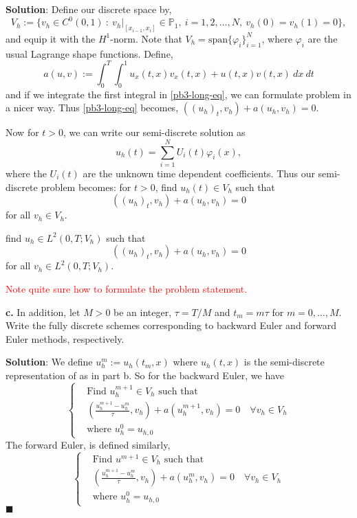\documentclass[11pt]{article}
\begin{document}
\vskip 1cm

{\bf Solution}: Define our discrete space by,
\begin{equation*}
    V_h := \{ v_h \in C^0(0,1) \: : \: v_h|_{[x_{i-1}, x_i]} \in \mathbb{P}_1, \: i = 1, 2, \ldots, N, \: v_h(0) = v_h(1) = 0 \},
\end{equation*}
and equip it with the $H^1$-norm.
Note that $V_h = \text{span}\{\varphi_i\}_{i=1}^N$, where $\varphi_i$ are the usual Lagrange shape functions.
Define,
\begin{equation*}
    a(u,v) := \int_0^T \int_0^1 u_x(t,x) v_x(t,x) + u(t,x) v(t,x) \: dx \: dt
\end{equation*}
and if we integrate the first integral in \eqref{pb3-long-eq}, we can formulate problem in a nicer way.
Thus \eqref{pb3-long-eq} becomes, $((u_h)_t, v_h) + a(u_h, v_h) = 0$.

Now for $t > 0$, we can write our semi-discrete solution as
\begin{equation}
    u_h(t) = \sum_{i=1}^N U_i(t) \varphi_i(x),
\end{equation}
where the $U_i(t)$ are the unknown time dependent coefficients.
Thus our semi-discrete problem becomes: for $t > 0$, find $u_h(t) \in V_h$ such that 
\begin{equation}
    ((u_h)_t, v_h) + a(u_h, v_h) = 0
\end{equation}
for all $v_h \in V_h$.

find $u_h \in L^2(0,T; V_h)$ such that 
\begin{equation}
    ((u_h)_t, v_h) + a(u_h, v_h) = 0
\end{equation}
for all $v_h \in L^2(0,T;V_h)$.

\textcolor{red}{Note quite sure how to formulate the problem statement.}

\vskip 2cm





{\bf c.} In addition, let $M > 0$ be an integer, $\tau = T/M$ and $t_m = m\tau$ for $m = 0, \ldots, M$. Write the fully discrete schemes corresponding to backward Euler and forward Euler methods, respectively. 

\vskip 1cm

{\bf Solution}: We define $u^m_h := u_h(t_m, x)$ where $u_h(t,x)$ is the semi-discrete representation of as in part b. So for the backward Euler, we have 
\[ \begin{cases} &\text{Find } u^{m+1}_h \in V_h \text{ such that } \\
&(\frac{u_h^{m+1} - u_h^m}{\tau}, v_h) + a(u^{m+1}_h, v_h) = 0 \quad \forall v_h\in V_h \\
&\text{where } u^0_h = u_{h,0} 
\end{cases} \]
The forward Euler, is defined similarly,
\[ \begin{cases} &\text{Find } u^{m+1}\in V_h \text{ such that } \\
&(\frac{u_h^{m+1} - u_h^m}{\tau}, v_h) + a(u^m_h, v_h) = 0 \quad \forall v_h\in V_h \\
&\text{where } u^0_h = u_{h,0} 
\end{cases} \]
$\blacksquare$
\end{document}
